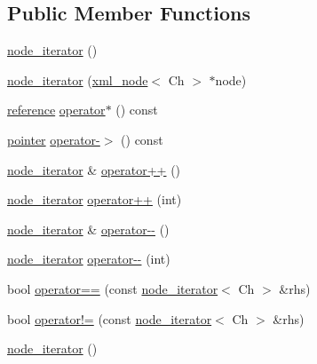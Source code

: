 \subsection*{Public Member Functions}
\begin{DoxyCompactItemize}
\item 
\mbox{\hyperlink{classrapidxml_1_1node__iterator_a4e1244b9e9e1d2b5129235806d1e31ad}{node\+\_\+iterator}} ()
\item 
\mbox{\hyperlink{classrapidxml_1_1node__iterator_a94c3da59b54e4bd003e226cc35b3c266}{node\+\_\+iterator}} (\mbox{\hyperlink{classrapidxml_1_1xml__node}{xml\+\_\+node}}$<$ Ch $>$ $\ast$node)
\item 
\mbox{\hyperlink{classrapidxml_1_1node__iterator_ad7fabbcb7d3d9e4e220299c5475b9e9c}{reference}} \mbox{\hyperlink{classrapidxml_1_1node__iterator_a47a076383ce706bb88e2b455646d8555}{operator$\ast$}} () const
\item 
\mbox{\hyperlink{classrapidxml_1_1node__iterator_a65dca8bca2b9c29f635b9ad0bdeeecb9}{pointer}} \mbox{\hyperlink{classrapidxml_1_1node__iterator_a203f946893733b2f8526b49c3c9039ef}{operator-\/$>$}} () const
\item 
\mbox{\hyperlink{classrapidxml_1_1node__iterator}{node\+\_\+iterator}} \& \mbox{\hyperlink{classrapidxml_1_1node__iterator_a8d6b184a76b2ec8a8b5e90bc013c80ed}{operator++}} ()
\item 
\mbox{\hyperlink{classrapidxml_1_1node__iterator}{node\+\_\+iterator}} \mbox{\hyperlink{classrapidxml_1_1node__iterator_ad01b4e43e348a330984833fd4924d0f2}{operator++}} (int)
\item 
\mbox{\hyperlink{classrapidxml_1_1node__iterator}{node\+\_\+iterator}} \& \mbox{\hyperlink{classrapidxml_1_1node__iterator_ace52107ecd1bcf02e49619e86206e3a3}{operator-\/-\/}} ()
\item 
\mbox{\hyperlink{classrapidxml_1_1node__iterator}{node\+\_\+iterator}} \mbox{\hyperlink{classrapidxml_1_1node__iterator_a4ca35716bb7865f199a137b063af6080}{operator-\/-\/}} (int)
\item 
bool \mbox{\hyperlink{classrapidxml_1_1node__iterator_a5cb8a3b0d65a1a2517995e986a4debfd}{operator==}} (const \mbox{\hyperlink{classrapidxml_1_1node__iterator}{node\+\_\+iterator}}$<$ Ch $>$ \&rhs)
\item 
bool \mbox{\hyperlink{classrapidxml_1_1node__iterator_a20f1e25347d7e3856694f18597f7c8e2}{operator!=}} (const \mbox{\hyperlink{classrapidxml_1_1node__iterator}{node\+\_\+iterator}}$<$ Ch $>$ \&rhs)
\item 
\mbox{\hyperlink{classrapidxml_1_1node__iterator_a4e1244b9e9e1d2b5129235806d1e31ad}{node\+\_\+iterator}} ()

\end{DoxyCompactItemize}
